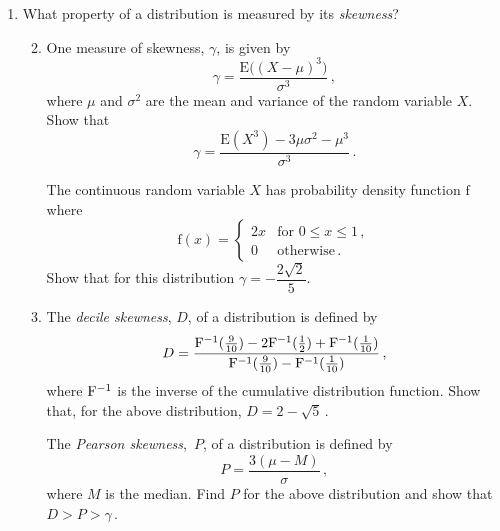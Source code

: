 \documentclass[a4, 11pt]{report}
\newlength{\qspace}
\newcounter{qnumber}
\newenvironment{question}%
 {\vspace{\qspace}
  \begin{enumerate}[\bfseries 1\quad][10]%
    \setcounter{enumi}{\value{qnumber}}%
    \item%
 }
{
  \end{enumerate}
  \filbreak
  \stepcounter{qnumber}
 }
\newenvironment{questionparts}[1][1]%
 {
  \begin{enumerate}[\bfseries (i)]%
    \setcounter{enumii}{#1}
    \addtocounter{enumii}{-1}
    \setlength{\itemsep}{5mm}
    \setlength{\parskip}{8pt}
 }
 {
  \end{enumerate}
 }
\def\f{{\mathrm f}}
\def\E{{\mathrm E}}
\def\le{\leqslant}
\begin{document}
\begin{question}
What property of a distribution is measured by its 
{\em skewness}?

\begin{questionparts}
\item 
One measure of  skewness, $\gamma$,  is given by 
\[
\displaystyle
\gamma=
\frac{ \E\big((X-\mu)^3\big)}{\sigma^3}\,,
\] 
where $\mu$ and $\sigma^2$ are the mean and variance of the random
variable  $X$.
Show that 
\[
\gamma = \frac{ \E(X^3) -3\mu \sigma^2 - \mu^3}{\sigma^3}\,.
\]

The continuous random variable $X$
has probability density function $\f$ where 
\[
\f(x) 
= \begin{cases}
2x & \text{for } 0\le x\le 1\,, \\[2mm]
0 & \text{otherwise}\,.
\end{cases}
\]
Show that for this distribution $\gamma= -\dfrac{2\sqrt2}{5}$.

\item The {\em decile skewness}, $D$,  of a distribution is defined by
\[D=
\frac { {\rm F}^{-1}(\frac9{10}) - 2{\rm F} ^{-1}(\frac12) + {\rm F}^{-1} (\frac1{10}) } 
{{\rm F}^{-1}(\frac9{10}) - {\rm F} ^{-1} (\frac1{10})}\,,
\]
where ${\rm F}^{-1}$ is the inverse of the 
cumulative distribution function.
Show that, for the above distribution,
$ 
D= 2 -\sqrt5\,.
$ 

 
 The {\em Pearson skewness},~$P$, of a distribution is defined by
\[
P = \frac{3(\mu-M)}{\sigma}
\,,\]
where $M$ is the median.
Find $P$ for the above distribution and show 
that
  $D>P>\gamma\,$.

\end{questionparts}
\end{question}
\end{document}
